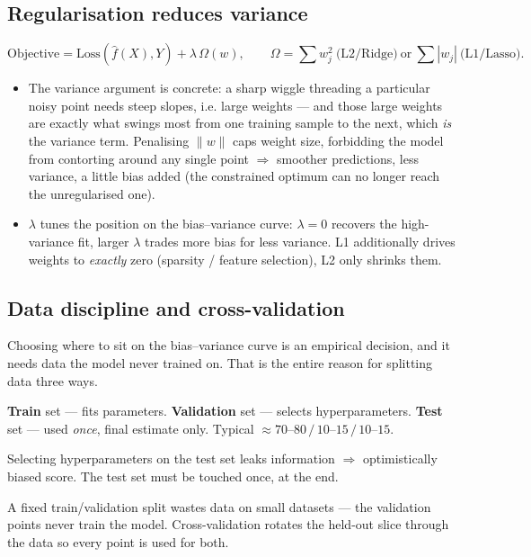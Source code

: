 \documentclass[11pt, a4paper]{article}
\newcommand{\kw}[1]{\textbf{#1}}
\begin{document}
\subsection{Regularisation reduces variance}

\[
\text{Objective}=\text{Loss}(\hat f(X),Y)+\lambda\,\Omega(w), \qquad
\Omega=\textstyle\sum w_j^2\ \text{(L2/Ridge)}\ \text{or}\ \sum|w_j|\ \text{(L1/Lasso)}.
\]
\begin{itemize}
  \item The variance argument is concrete: a sharp wiggle threading a particular noisy point needs
  steep slopes, i.e. large weights — and those large weights are exactly what swings most from one
  training sample to the next, which \emph{is} the variance term. Penalising $\|w\|$ caps weight size,
  forbidding the model from contorting around any single point $\Rightarrow$ smoother predictions,
  less variance, a little bias added (the constrained optimum can no longer reach the unregularised
  one).
  \item $\lambda$ tunes the position on the bias--variance curve: $\lambda=0$ recovers the
  high-variance fit, larger $\lambda$ trades more bias for less variance. L1 additionally drives
  weights to \emph{exactly} zero (sparsity / feature selection), L2 only shrinks them.
\end{itemize}

\subsection{Data discipline and cross-validation}

Choosing where to sit on the bias--variance curve is an empirical decision, and it needs data the
model never trained on. That is the entire reason for splitting data three ways.

\begin{defbox}
\kw{Train} set — fits parameters. \kw{Validation} set — selects hyperparameters. \kw{Test} set —
used \emph{once}, final estimate only. Typical $\approx70$–$80\,/\,10$–$15\,/\,10$–$15$.
\end{defbox}

\begin{pitfallbox}
Selecting hyperparameters on the test set leaks information $\Rightarrow$ optimistically biased
score. The test set must be touched once, at the end.
\end{pitfallbox}

A fixed train/validation split wastes data on small datasets — the validation points never train the
model. Cross-validation rotates the held-out slice through the data so every point is used for both.
\end{document}
